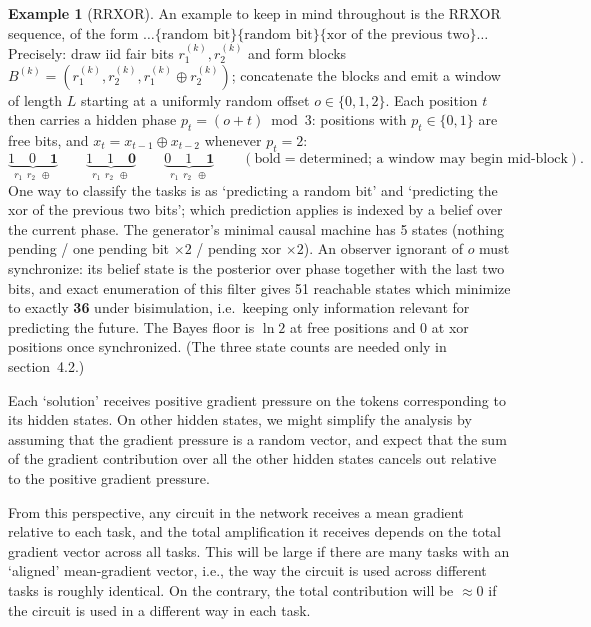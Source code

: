 \documentclass[10pt]{article}
\theoremstyle{definition}
\newtheorem{example}{Example}
\begin{document}
\begin{example}[RRXOR]\label{ex:rrxor}
An example to keep in mind throughout is the RRXOR sequence, of the form $\ldots\{\text{random bit}\}\{\text{random bit}\}\{\text{xor of the previous two}\}\ldots$ Precisely: draw iid fair bits $r_1^{(k)}, r_2^{(k)}$ and form blocks $B^{(k)} = (r_1^{(k)}, r_2^{(k)}, r_1^{(k)} \oplus r_2^{(k)})$; concatenate the blocks and emit a window of length $L$ starting at a uniformly random offset $o \in \{0,1,2\}$. Each position $t$ then carries a hidden phase $p_t = (o+t) \bmod 3$: positions with $p_t \in \{0,1\}$ are free bits, and $x_t = x_{t-1} \oplus x_{t-2}$ whenever $p_t = 2$:
$$\underbrace{1 \quad 0 \quad \mathbf{1}}_{r_1\ \ r_2\ \ \oplus} \qquad \underbrace{1 \quad 1 \quad \mathbf{0}}_{r_1\ \ r_2\ \ \oplus} \qquad \underbrace{0 \quad 1 \quad \mathbf{1}}_{r_1\ \ r_2\ \ \oplus} \qquad (\text{bold} = \text{determined; a window may begin mid-block}).$$ One way to classify the tasks is as `predicting a random bit' and `predicting the xor of the previous two bits'; which prediction applies is indexed by a belief over the current phase. The generator's minimal causal machine has 5 states (nothing pending / one pending bit $\times 2$ / pending xor $\times 2$). An observer ignorant of $o$ must synchronize: its belief state is the posterior over phase together with the last two bits, and exact enumeration of this filter gives 51 reachable states which minimize to exactly \textbf{36} under bisimulation, i.e.\ keeping only information relevant for predicting the future. The Bayes floor is $\ln 2$ at free positions and $0$ at xor positions once synchronized. (The three state counts are needed only in section~4.2.)
\end{example}

Each `solution' receives positive gradient pressure on the tokens corresponding to its hidden states. On other hidden states, we might simplify the analysis by assuming that the gradient pressure is a random vector, and expect that the sum of the gradient contribution over all the other hidden states cancels out relative to the positive gradient pressure.

From this perspective, any circuit in the network receives a mean gradient relative to each task, and the total amplification it receives depends on the total gradient vector across all tasks. This will be large if there are many tasks with an `aligned' mean-gradient vector, i.e., the way the circuit is used across different tasks is roughly identical. On the contrary, the total contribution will be $\approx 0$ if the circuit is used in a different way in each task.
\end{document}
